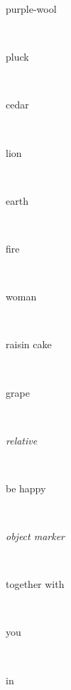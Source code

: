 \documentclass[a4paper]{article}
\begin{document}
\begin{multicols}{4}
\begin{multicols}{4}
\begin{multicols}{5}
{\hebrewfont{}} \begin{english}purple-wool\end{english}\\
{\hebrewfont{}} \begin{english}pluck\end{english}\\
{\hebrewfont{}} \begin{english}cedar\end{english}\\
{\hebrewfont{}} \begin{english}lion\end{english}\\
{\hebrewfont{}} \begin{english}earth\end{english}\\
{\hebrewfont{}} \begin{english}fire\end{english}\\
{\hebrewfont{}} \begin{english}woman\end{english}\\
{\hebrewfont{}} \begin{english}raisin cake\end{english}\\
{\hebrewfont{}} \begin{english}grape\end{english}\\
{\hebrewfont{}} \begin{english}\textit{relative}\end{english}\\
{\hebrewfont{}} \begin{english}be happy\end{english}\\
{\hebrewfont{}} \begin{english}\textit{object marker}\end{english}\\
{\hebrewfont{}} \begin{english}together with\end{english}\\
{\hebrewfont{}} \begin{english}you\end{english}\\
{\hebrewfont{}} \begin{english}in\end{english}\\

\end{multicols}
\end{multicols}
\end{multicols}
\end{document}
